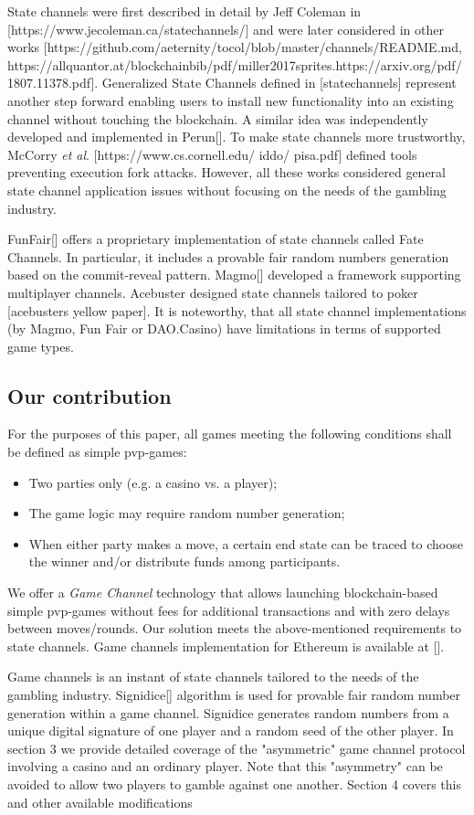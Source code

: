 	State channels were first described in detail by Jeff Coleman in [https://www.jecoleman.ca/statechannels/] and were later considered in other works [https://github.com/aeternity/tocol/blob/master/channels/README.md, https://allquantor.at/blockchainbib/pdf/miller2017sprites.https://arxiv.org/pdf/1807.11378.pdf]. Generalized State Channels defined in [statechannels] represent another step forward enabling users to install new functionality into an existing channel without touching the blockchain. A similar idea was independently developed and implemented in Perun[]. To make state channels more trustworthy, McCorry \textit {et al}. [https://www.cs.cornell.edu/ iddo/ pisa.pdf] defined tools preventing execution fork attacks. However, all these works considered general state channel application issues without focusing on the needs of the gambling industry.

	FunFair[] offers a proprietary implementation of state channels called Fate Channels. In particular, it includes a provable fair random numbers generation based on the commit-reveal pattern. Magmo[] developed a framework supporting multiplayer channels. Acebuster designed  state channels tailored to poker [acebusters yellow paper]. It is noteworthy, that all state channel implementations (by Magmo, Fun Fair or DAO.Casino) have limitations in terms of supported game types.

		\subsection {Our contribution}
	For the purposes of this paper, all games meeting the following conditions shall be defined as simple pvp-games:
	\begin{itemize}
		\item Two parties only (e.g. a casino vs. a player);
		\item The game logic may require random number generation;
		\item When either party makes a move, a certain end state can be traced to choose the winner and/or distribute funds among participants.
	\end{itemize}
	We offer a \textit {Game Channel} technology that allows launching blockchain-based simple pvp-games without fees for additional transactions and with zero delays between moves/rounds. Our solution meets the above-mentioned requirements to state channels. Game channels implementation for Ethereum is available at [].

	Game channels is an instant of state channels tailored to the needs of the gambling industry. Signidice[]
algorithm is used for provable fair random number generation within a game channel. Signidice generates random numbers from a unique digital signature of one player and a random seed of the other player. In section 3 we provide detailed coverage of the "asymmetric" game channel protocol involving a casino and an ordinary player. Note that this "asymmetry" can be avoided to allow two players to gamble against one another. Section 4 covers this and other available modifications